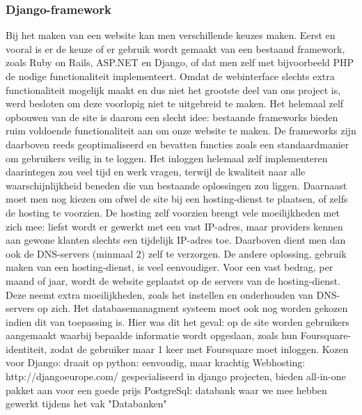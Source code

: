 \subsubsection{Django-framework}
Bij het maken van een website kan men verschillende keuzes maken.
Eerst en vooral is er de keuze of er gebruik wordt gemaakt van een bestaand framework, zoals Ruby on Rails, ASP.NET en Django, of dat men zelf met bijvoorbeeld PHP de nodige functionaliteit implementeert.
Omdat de webinterface slechts extra functionaliteit mogelijk maakt en dus niet het grootste deel van ons project is, werd besloten om deze voorlopig niet te uitgebreid te maken.
Het helemaal zelf opbouwen van de site is daarom een slecht idee: bestaande frameworks bieden ruim voldoende functionaliteit aan om onze website te maken. De frameworks zijn daarboven reeds geoptimaliseerd en bevatten functies zoals een standaardmanier om gebruikers veilig in te loggen. Het inloggen helemaal zelf implementeren daarintegen zou veel tijd en werk vragen, terwijl de kwaliteit naar alle waarschijnlijkheid beneden die van bestaande oplossingen zou liggen. 
Daarnaast moet men nog kiezen om ofwel de site bij een hosting-dienst te plaatsen, of zelfs de hosting te voorzien. De hosting zelf voorzien brengt vele moeilijkheden met zich mee: liefst wordt er gewerkt met een vast IP-adres, maar providers kennen aan gewone klanten slechts een tijdelijk IP-adres toe. Daarboven dient men dan ook de DNS-servers (minmaal 2) zelf te verzorgen.
De andere oplossing, gebruik maken van een hosting-dienst, is veel eenvoudiger. Voor een vast bedrag, per maand of jaar, wordt de website geplaatst op de servers van de hosting-dienst. Deze neemt extra moeilijkheden, zoals het instellen en onderhouden van DNS-servers op zich.
Het databasemanagment systeem moet ook nog worden gekozen indien dit van toepassing is. Hier was dit het geval: op de site worden gebruikers aangemaakt waarbij bepaalde informatie wordt opgeslaan, zoals hun Foursquare-identiteit, zodat de gebruiker maar 1 keer met Foursquare moet inloggen.
Kozen voor Django: draait op python: eenvoudig, maar krachtig
Webhosting: http://djangoeurope.com/ gespecialiseerd in django projecten, bieden all-in-one pakket aan voor een goede prijs
PostgreSql: databank waar we mee hebben gewerkt tijdens het vak "Databanken"
